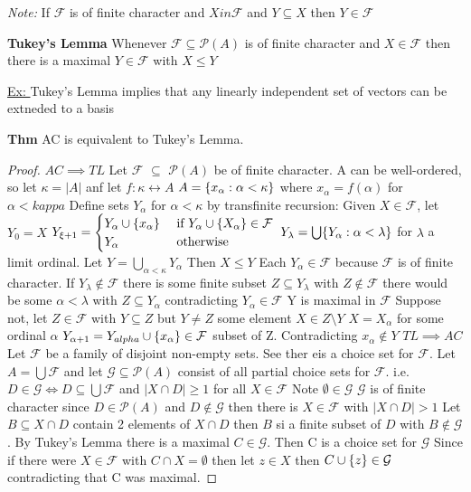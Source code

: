 \emph{Note: } If $\mathcal{F}$ is of finite character and $X in \mathcal{F}$ and $Y \subseteq X$ then $Y \in \mathcal{F}$

\dfn \textbf{Tukey's Lemma} Whenever $\mathcal{F} \subseteq \mathcal{P}(A)$ is of finite character and $X \in \mathcal{F}$
then there is a maximal $Y \in \mathcal{F}$ with $X \leq Y$

\underline{Ex: } Tukey's Lemma implies that any linearly independent set of vectors can be extneded to a basis

\textbf{Thm} AC is equivalent to Tukey's Lemma.

\newcommand{\FF}{\mathcal F}
\newcommand{\PP}{\mathcal{P}}

\begin{proof}
    \textbf{$AC \implies TL$}
    Let $\FF$ $\subseteq$ $\PP(A)$ be of finite character.
    A can be well-ordered, so let
    $\kappa = |A|$ anf let $f: \kappa \leftrightarrow A$
    $A = \{ x_\alpha : \alpha < \kappa\}$ where $x_\alpha = f(\alpha)$ for $\alpha < kappa$
    Define sets $Y_\alpha$ for $\alpha < \kappa$ by transfinite recursion:
    Given $X \in \FF$, let
    $Y_0 = X$
    $Y_{\xi +1} = \begin{cases} Y_\alpha \cup \set{x_\alpha} & \text{ if } Y_{\alpha} \cup \set{X_\alpha} \in \FF \\ Y_\alpha & \text{ otherwise } \end{cases}$
    $Y_\lambda = \bigcup \{Y_\alpha : \alpha < \lambda\}$ for $\lambda$ a limit ordinal.
    Let $Y =  \bigcup_{\alpha < \kappa} Y_\alpha$
    Then $X \leq Y$
    Each $Y_\alpha \in \FF$ because $\FF$ is of finite character.
    If $Y_{\lambda} \notin \FF$ there is some finite subset $Z \subseteq Y_\lambda$ with $Z \notin \FF$ there would
    be some $\alpha < \lambda$ with $Z \subseteq Y_\alpha$ contradicting $Y_\alpha \in \FF$
    Y is maximal in $\FF$
    Suppose not, let $Z \in \FF$ with $Y \subseteq Z$ but $Y \neq Z$
    some element $X \in Z \setminus Y$
    $X = X_\alpha$ for some ordinal $\alpha$
    $Y_{\alpha+1} = Y_{alpha} \cup \set{x_\alpha} \in \FF$ subset of Z.
    Contradicting $x_\alpha \notin Y$
    \textbf{$TL \implies AC$}
    Let $\FF$ be a family of disjoint non-empty sets.
    See ther eis a choice set for $\FF$.
    Let $A = \bigcup \FF$ and let $\mathcal{G} \subseteq \PP(A)$ consist of all partial choice sets for $\FF$.
    i.e. $D \in \mathcal{G} \iff D \subseteq \bigcup \FF$ and $|X \cap D| \geq 1$ for all $X \in \FF$
    Note $\emptyset \in \mathcal{G}$
    $\mathcal{G}$ is of finite character since $D \in \PP(A)$ and $D \notin \mathcal{G}$ then there is $X \in \FF$ with $|X \cap D| > 1$
    Let $B \subseteq X \cap D$ contain 2 elements of $X \cap D$ then $B$ si a finite subset of $D$ with $B \notin \mathcal{G}$.
    By Tukey's Lemma there is a maximal $C \in \mathcal{G}$.
    Then C is a choice set for $\mathcal{G}$
    Since if there were $X \in \FF$ with $C \cap X = \emptyset$  then
    let $z \in X$ then $C \cup \{z\} \in \mathcal{G}$
    contradicting that C was maximal.
\end{proof}


